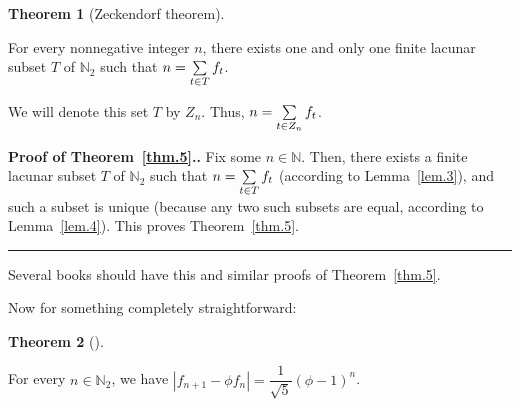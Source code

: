 \documentclass[numbers=enddot,12pt,final,onecolumn,notitlepage]{scrartcl}%
\numberwithin{exer}{section}
\theoremstyle{definition}
\newtheorem{theo}{Theorem}[section]
\newenvironment{theorem}[1][]
{\begin{theo}[#1]\begin{leftbar}}
{\end{leftbar}\end{theo}}
\newenvironment{proof}[1][Proof]{\noindent\textbf{#1.} }{\ \rule{0.5em}{0.5em}}
\let\sumnonlimits\sum
\renewcommand{\sum}{\sumnonlimits\limits}
\begin{document}
\begin{theorem}[Zeckendorf theorem] \label{thm.5}
For every nonnegative integer $n$,
there exists one and only one finite lacunar subset $T$ of $\mathbb{N}_{2}$
such that $n=\sum\limits_{t\in T}f_{t}$.

We will denote this set $T$ by $Z_{n}$. Thus, $n=\sum\limits_{t\in Z_{n}}%
f_{t}$.
\end{theorem}

\begin{proof}[Proof of Theorem~\ref{thm.5}.]Fix some $n\in\mathbb{N}$. Then, there exists a
finite lacunar subset $T$ of $\mathbb{N}_{2}$ such that $n=\sum\limits_{t\in
T}f_{t}$ (according to Lemma~\ref{lem.3}), and such a subset is unique (because any two
such subsets are equal, according to Lemma~\ref{lem.4}). This proves Theorem~\ref{thm.5}.
\end{proof}

Several books should have this and similar proofs of Theorem~\ref{thm.5}.

Now for something completely straightforward:

\begin{theorem} \label{thm.6}
For every $n\in\mathbb{N}_{2}$, we have $\left\vert
f_{n+1}-\phi f_{n}\right\vert =\dfrac{1}{\sqrt{5}}\left(  \phi-1\right)  ^{n}$.
\end{theorem}
\end{document}
